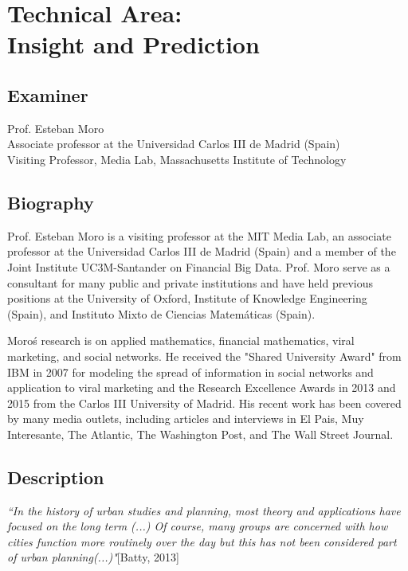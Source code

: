 

\section*{Technical Area:\\Insight and Prediction}
% 
\subsection*{Examiner}
Prof. Esteban Moro\\
Associate professor at the Universidad Carlos III de Madrid (Spain)\\
Visiting Professor, Media Lab, Massachusetts Institute of Technology
% 
\subsection*{Biography}
% 
Prof. Esteban Moro is a visiting professor at the MIT Media Lab, an associate professor at the Universidad Carlos III de Madrid (Spain) and a member of the Joint Institute UC3M-Santander on Financial Big Data. Prof. Moro serve as a consultant for many public and private institutions and have held previous positions at the University of Oxford, Institute of Knowledge Engineering (Spain), and Instituto Mixto de Ciencias Matemáticas (Spain).\par
Moro\'s research is on applied mathematics, financial mathematics, viral marketing, and social networks. He received the "Shared University Award" from IBM in 2007 for modeling the spread of information in social networks and application to viral marketing and the Research Excellence Awards in 2013 and 2015 from the Carlos III University of Madrid. His recent work has been covered by many media outlets, including articles and interviews in El Pais, Muy Interesante, The Atlantic, The Washington Post, and The Wall Street Journal.
% 
\subsection*{Description}
% 
\textit{``In the history of urban studies and planning, most theory and applications have focused on the long term (...) Of course, many groups are concerned with how cities function more routinely over the day but this has not been considered part of urban planning(...)"}[Batty, 2013]\newline 

